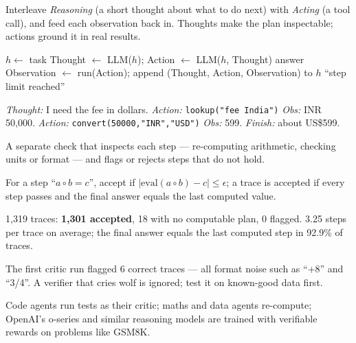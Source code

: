 \documentclass[11pt,a4paper]{article}
\begin{document}

\begin{bdef}[ReAct]
Interleave \emph{Reasoning} (a short thought about what to do next) with \emph{Acting} (a tool call), and feed each observation back in. Thoughts make the plan inspectable; actions ground it in real results.
\end{bdef}
\begin{balgo}
\begin{algorithmic}[1]
\State $h\gets$ task
  \State Thought $\gets$ LLM($h$); Action $\gets$ LLM($h$, Thought)
   \State \Return answer \EndIf
  \State Observation $\gets$ run(Action); append (Thought, Action, Observation) to $h$
\EndFor
\State \Return ``step limit reached''
\end{algorithmic}
\end{balgo}
\begin{bex}[Trace]
\emph{Thought:} I need the fee in dollars. \emph{Action:} \texttt{lookup("fee India")} \emph{Obs:} INR 50,000. \emph{Action:} \texttt{convert(50000,"INR","USD")} \emph{Obs:} 599. \emph{Finish:} about US\$599.
\end{bex}

\begin{bdef}
A separate check that inspects each step --- re-computing arithmetic, checking units or format --- and flags or rejects steps that do not hold.
\end{bdef}
\begin{bmath}
For a step ``$a\circ b=c$'', accept if $|\mathrm{eval}(a\circ b)-c|\le\epsilon$; a trace is accepted if every step passes and the final answer equals the last computed value.
\end{bmath}
\begin{bres}
1,319 traces: \textbf{1,301 accepted}, 18 with no computable plan, 0 flagged. 3.25 steps per trace on average; the final answer equals the last computed step in 92.9\% of traces.
\end{bres}
\begin{bwarn}
The first critic run flagged 6 correct traces --- all format noise such as ``+8'' and ``3/4''. A verifier that cries wolf is ignored; test it on known-good data first.
\end{bwarn}
\begin{bapp}
Code agents run tests as their critic; maths and data agents re-compute; OpenAI's o-series and similar reasoning models are trained with verifiable rewards on problems like GSM8K.
\end{bapp}
\end{document}
